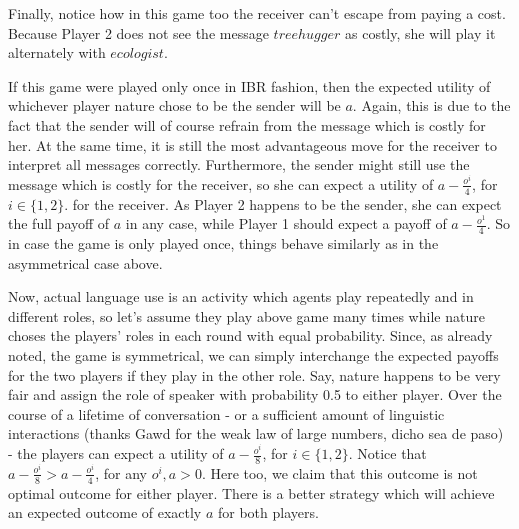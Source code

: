 \documentclass[10]{article}
\begin{document}
Finally, notice how in this game too the receiver can't escape from paying a cost. Because Player 2 does not see the message $treehugger$ as costly, she will play it alternately with $ecologist$.

If this game were played only once in IBR fashion, then the expected utility of whichever player nature chose to be the sender will be $a$. Again, this is due to the fact that the sender will of course refrain from the message which is costly for her. At the same time, it is still the most advantageous move for the receiver to interpret all messages correctly. Furthermore, the sender might still use the message which is costly for the receiver, so she can expect a utility of $a-\tfrac{o^i}{4}$, for $i\in \{1,2\}$. for the receiver. As Player 2 happens to be the sender, she can expect the full payoff of $a$ in any case, while Player 1 should expect a payoff of $a-\tfrac{o^1}{4}$. So in case the game is only played once, things behave similarly as in the asymmetrical case above.

Now, actual language use is an activity which agents play repeatedly and in different roles, so let's assume they play above game many times while nature choses the players' roles in each round with equal probability. Since, as already noted, the game is symmetrical, we can simply interchange the expected payoffs for the two players if they play in the other role. Say, nature happens to be very fair and assign the role of speaker with probability 0.5 to either player. Over the course of a lifetime of conversation - or a sufficient amount of linguistic interactions (thanks Gawd for the weak law of large numbers, dicho sea de paso) - the players can expect a utility of $a-\tfrac{o^i}{8}$, for $i\in \{1,2\}$. Notice that $a-\tfrac{o^i}{8} > a-\tfrac{o^i}{4}$, for any $o^i,a>0$. %
Here too, we claim that this outcome is not optimal outcome for either player. There is a better strategy which will achieve an expected outcome of exactly $a$ for both players. 
\end{document}
